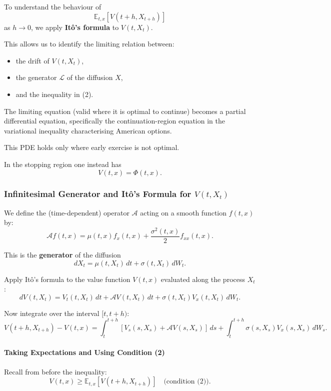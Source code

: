 \documentclass[12pt,a4paper]{article}
\theoremstyle{definition}
\begin{document}
To understand the behaviour of
\[
\mathbb{E}_{t,x}[V(t+h, X_{t+h})]
\]
as $h \to 0$, we apply \textbf{Itô's formula} to $V(t, X_t)$.

This allows us to identify the limiting relation between:
\begin{itemize}
\item the drift of $V(t, X_t)$,
\item the generator $\mathcal{L}$ of the diffusion $X$,
\item and the inequality in (2).
\end{itemize}

The limiting equation (valid where it is optimal to continue) becomes a partial differential equation, specifically the continuation-region equation in the variational inequality characterising American options.

This PDE holds only where early exercise is not optimal.

In the stopping region one instead has
\[
V(t, x) = \Phi(t, x).
\]

\subsubsection{Infinitesimal Generator and Itô's Formula for $V(t, X_t)$}

We define the (time-dependent) operator $\mathcal{A}$ acting on a smooth function $f(t, x)$ by:
\[
\mathcal{A}f(t, x) = \mu(t, x) f_x(t, x) + \frac{\sigma^2(t, x)}{2} f_{xx}(t, x).
\]

This is the \textbf{generator} of the diffusion
\[
dX_t = \mu(t, X_t) \, dt + \sigma(t, X_t) \, dW_t.
\]

Apply Itô's formula to the value function $V(t, x)$ evaluated along the process $X_t$:
\[
dV(t, X_t) = V_t(t, X_t) \, dt + \mathcal{A}V(t, X_t) \, dt + \sigma(t, X_t) V_x(t, X_t) \, dW_t.
\]

Now integrate over the interval $[t, t+h)$:
\[
V(t+h, X_{t+h}) - V(t, x) = \int_t^{t+h} [V_s(s, X_s) + \mathcal{A}V(s, X_s)] \, ds + \int_t^{t+h} \sigma(s, X_s) V_x(s, X_s) \, dW_s.
\]

\paragraph{Taking Expectations and Using Condition (2)}

Recall from before the inequality:
\[
V(t, x) \geq \mathbb{E}_{t,x}[V(t+h, X_{t+h})] \quad \text{(condition (2))}.
\]
\end{document}
